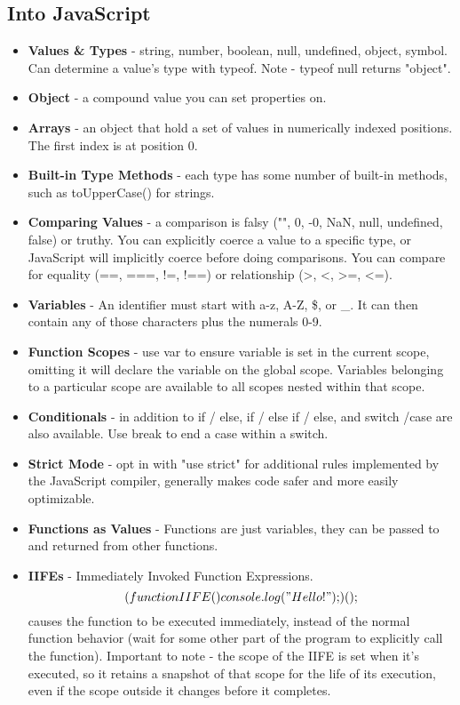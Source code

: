 \subsection{Into JavaScript}
\begin{itemize}
\item \textbf{Values \& Types} - string, number, boolean, null, undefined, object, symbol. Can determine a value's type with typeof. Note - typeof null returns "object".
\item \textbf{Object} - a compound value you can set properties on.
\item \textbf{Arrays} - an object that hold a set of values in numerically indexed positions. The first index is at position 0.
\item \textbf{Built-in Type Methods} - each type has some number of built-in methods, such as toUpperCase() for strings.
\item \textbf{Comparing Values} - a comparison is falsy ("", 0, -0, NaN, null, undefined, false) or truthy. You can explicitly coerce a value to a specific type, or JavaScript will implicitly coerce before doing comparisons. You can compare for equality (==, ===, !=, !==) or relationship (>, <, >=, <=).
\item \textbf{Variables} - An identifier must start with a-z, A-Z, \$, or \_. It can then contain any of those characters plus the numerals 0-9.
\item \textbf{Function Scopes} - use var to ensure variable is set in the current scope, omitting it will declare the variable on the global scope. Variables belonging to a particular scope are available to all scopes nested within that scope.
\item \textbf{Conditionals} - in addition to if / else, if / else if / else, and switch /case are also available. Use break to end a case within a switch.
\item \textbf{Strict Mode} - opt in with "use strict" for additional rules implemented by the JavaScript compiler, generally makes code safer and more easily optimizable.
\item \textbf{Functions as Values} - Functions are just variables, they can be passed to and returned from other functions.
\item \textbf{IIFEs} - Immediately Invoked Function Expressions. $$(function IIFE(){
	console.log( "Hello!" );
})();$$ causes the function to be executed immediately, instead of the normal function behavior (wait for some other part of the program to explicitly call the function). Important to note - the scope of the IIFE is set when it's executed, so it retains a snapshot of that scope for the life of its execution, even if the scope outside it changes before it completes.

\end{itemize}
